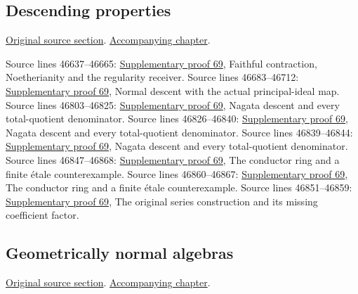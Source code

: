 \subsection{Descending properties}
\hypertarget{algebra-source-section-descending-properties}{}
\noindent\href{https://github.com/stacks/stacks-project/blob/a04446e57ec1fbc252a871afcec7752fb2807b14/algebra.tex\#L46633}{Original source section}. \href{algebra.pdf\#nameddest=section-descending-properties}{Accompanying chapter}.

\begin{AlgebraSourceRoutes}
 Source lines 46637--46665: \hyperlink{algebra_descent_notes_20260929}{Supplementary proof 69}, Faithful contraction, Noetherianity and the regularity receiver.
 Source lines 46683--46712: \hyperlink{algebra_descent_notes_20260929}{Supplementary proof 69}, Normal descent with the actual principal-ideal map.
 Source lines 46803--46825: \hyperlink{algebra_descent_notes_20260929}{Supplementary proof 69}, Nagata descent and every total-quotient denominator.
 Source lines 46826--46840: \hyperlink{algebra_descent_notes_20260929}{Supplementary proof 69}, Nagata descent and every total-quotient denominator.
 Source lines 46839--46844: \hyperlink{algebra_descent_notes_20260929}{Supplementary proof 69}, Nagata descent and every total-quotient denominator.
 Source lines 46847--46868: \hyperlink{algebra_descent_notes_20260929}{Supplementary proof 69}, The conductor ring and a finite étale counterexample.
 Source lines 46860--46867: \hyperlink{algebra_descent_notes_20260929}{Supplementary proof 69}, The conductor ring and a finite étale counterexample.
 Source lines 46851--46859: \hyperlink{algebra_descent_notes_20260929}{Supplementary proof 69}, The original series construction and its missing coefficient factor.
\end{AlgebraSourceRoutes}

\subsection{Geometrically normal algebras}
\hypertarget{algebra-source-section-geometrically-normal}{}
\noindent\href{https://github.com/stacks/stacks-project/blob/a04446e57ec1fbc252a871afcec7752fb2807b14/algebra.tex\#L46878}{Original source section}. \href{algebra.pdf\#nameddest=section-geometrically-normal}{Accompanying chapter}.

